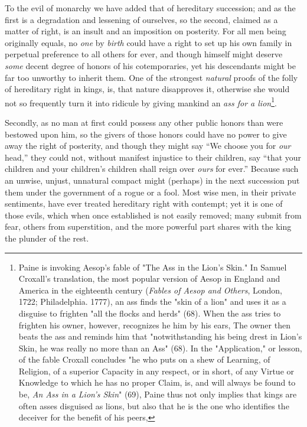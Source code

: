 \documentclass[12pt, twocolumn]{book}
\begin{document}
    To the evil of monarchy we have added that of hereditary succession; and as the first is a degradation and lessening of ourselves, so the second, claimed as a matter of right, is an insult and an imposition on posterity. For all men being originally equals, no \textit{one} by \textit{birth} could have a right to set up his own family in perpetual preference to all others for ever, and though himself might deserve \textit{some} decent degree of honors of his cotemporaries, yet his descendants might be far too unworthy to inherit them. One of the strongest \textit{natural} proofs of the folly of hereditary right in kings, is, that nature disapproves it, otherwise she would not so frequently turn it into ridicule by giving mankind an \textit{ass for a lion}\footnote{Paine is invoking Aesop's fable of "The Ass in the Lion's Skin." In Samuel Croxall's translation, the most popular version of Aesop in England and America in the eighteenth century (\textit{Fables of Aesop and Others}, London, 1722; Philadelphia. 1777), an ass finds the "skin of a lion" and uses it as a disguise to frighten "all the flocks and herds" (68). When the ass tries to frighten his owner, however, recognizes he him by his ears, The owner then beats the ass and reminds him that "notwithstanding his being drest in Lion's Skin, he was really no more than an Ass" (68). In the "Application," or lesson, of the fable Croxall concludes "he who puts on a shew of Learning, of Religion, of a superior Capacity in any respect, or in short, of any Virtue or Knowledge to which he has no proper Claim, is, and will always be found to be, \textit{An Ass in a Lion's Skin}" (69), Paine thus not only implies that kings are often asses disguised as lions, but also that he is the one who identifies the deceiver for the benefit of his peers, }.

    Secondly, as no man at first could possess any other public honors than were bestowed upon him, so the givers of those honors could have no power to give away the right of posterity, and though they might say “We choose you for \textit{our} head,” they could not, without manifest injustice to their children, say “that your children and your children’s children shall reign over \textit{ours} for ever.” Because such an unwise, unjust, unnatural compact might (perhaps) in the next succession put them under the government of a rogue or a fool. Most wise men, in their private sentiments, have ever treated hereditary right with contempt; yet it is one of those evils, which when once established is not easily removed; many submit from fear, others from superstition, and the more powerful part shares with the king the plunder of the rest.
\end{document}
